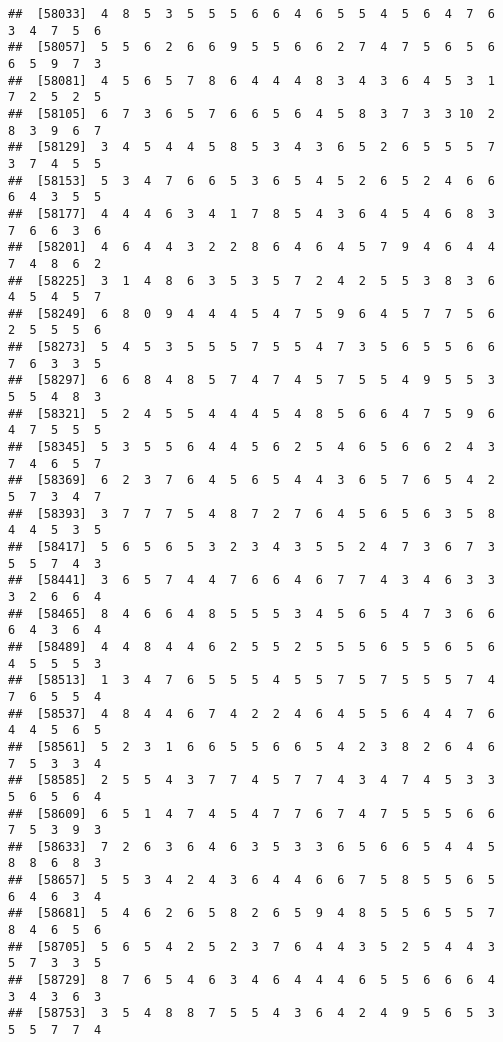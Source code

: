 \documentclass[
]{book}
\begin{document}
\begin{verbatim}
##  [58033]  4  8  5  3  5  5  5  6  6  4  6  5  5  4  5  6  4  7  6  3  4  7  5  6
##  [58057]  5  5  6  2  6  6  9  5  5  6  6  2  7  4  7  5  6  5  6  6  5  9  7  3
##  [58081]  4  5  6  5  7  8  6  4  4  4  8  3  4  3  6  4  5  3  1  7  2  5  2  5
##  [58105]  6  7  3  6  5  7  6  6  5  6  4  5  8  3  7  3  3 10  2  8  3  9  6  7
##  [58129]  3  4  5  4  4  5  8  5  3  4  3  6  5  2  6  5  5  5  7  3  7  4  5  5
##  [58153]  5  3  4  7  6  6  5  3  6  5  4  5  2  6  5  2  4  6  6  6  4  3  5  5
##  [58177]  4  4  4  6  3  4  1  7  8  5  4  3  6  4  5  4  6  8  3  7  6  6  3  6
##  [58201]  4  6  4  4  3  2  2  8  6  4  6  4  5  7  9  4  6  4  4  7  4  8  6  2
##  [58225]  3  1  4  8  6  3  5  3  5  7  2  4  2  5  5  3  8  3  6  4  5  4  5  7
##  [58249]  6  8  0  9  4  4  4  5  4  7  5  9  6  4  5  7  7  5  6  2  5  5  5  6
##  [58273]  5  4  5  3  5  5  5  7  5  5  4  7  3  5  6  5  5  6  6  7  6  3  3  5
##  [58297]  6  6  8  4  8  5  7  4  7  4  5  7  5  5  4  9  5  5  3  5  5  4  8  3
##  [58321]  5  2  4  5  5  4  4  4  5  4  8  5  6  6  4  7  5  9  6  4  7  5  5  5
##  [58345]  5  3  5  5  6  4  4  5  6  2  5  4  6  5  6  6  2  4  3  7  4  6  5  7
##  [58369]  6  2  3  7  6  4  5  6  5  4  4  3  6  5  7  6  5  4  2  5  7  3  4  7
##  [58393]  3  7  7  7  5  4  8  7  2  7  6  4  5  6  5  6  3  5  8  4  4  5  3  5
##  [58417]  5  6  5  6  5  3  2  3  4  3  5  5  2  4  7  3  6  7  3  5  5  7  4  3
##  [58441]  3  6  5  7  4  4  7  6  6  4  6  7  7  4  3  4  6  3  3  3  2  6  6  4
##  [58465]  8  4  6  6  4  8  5  5  5  3  4  5  6  5  4  7  3  6  6  6  4  3  6  4
##  [58489]  4  4  8  4  4  6  2  5  5  2  5  5  5  6  5  5  6  5  6  4  5  5  5  3
##  [58513]  1  3  4  7  6  5  5  5  4  5  5  7  5  7  5  5  5  7  4  7  6  5  5  4
##  [58537]  4  8  4  4  6  7  4  2  2  4  6  4  5  5  6  4  4  7  6  4  4  5  6  5
##  [58561]  5  2  3  1  6  6  5  5  6  6  5  4  2  3  8  2  6  4  6  7  5  3  3  4
##  [58585]  2  5  5  4  3  7  7  4  5  7  7  4  3  4  7  4  5  3  3  5  6  5  6  4
##  [58609]  6  5  1  4  7  4  5  4  7  7  6  7  4  7  5  5  5  6  6  7  5  3  9  3
##  [58633]  7  2  6  3  6  4  6  3  5  3  3  6  5  6  6  5  4  4  5  8  8  6  8  3
##  [58657]  5  5  3  4  2  4  3  6  4  4  6  6  7  5  8  5  5  6  5  6  4  6  3  4
##  [58681]  5  4  6  2  6  5  8  2  6  5  9  4  8  5  5  6  5  5  7  8  4  6  5  6
##  [58705]  5  6  5  4  2  5  2  3  7  6  4  4  3  5  2  5  4  4  3  5  7  3  3  5
##  [58729]  8  7  6  5  4  6  3  4  6  4  4  4  6  5  5  6  6  6  4  3  4  3  6  3
##  [58753]  3  5  4  8  8  7  5  5  4  3  6  4  2  4  9  5  6  5  3  5  5  7  7  4

\end{verbatim}
\end{document}

